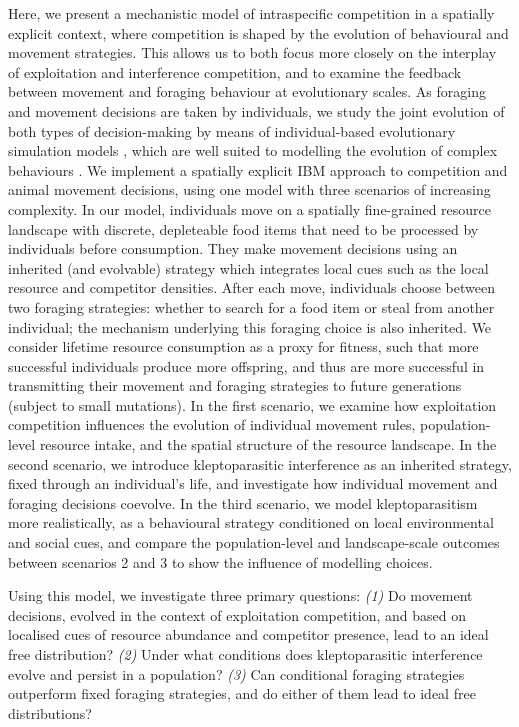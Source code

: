 \documentclass[11pt]{article}
\begin{document}
Here, we present a mechanistic model of intraspecific competition in a spatially explicit context, where competition is shaped by the evolution of behavioural and movement strategies.
This allows us to both focus more closely on the interplay of exploitation and interference competition, and to examine the feedback between movement and foraging behaviour at evolutionary scales. 
As foraging and movement decisions are taken by individuals, we study the joint evolution of both types of decision-making by means of individual-based evolutionary simulation models \citep[IBMs;][]{huston1988,deangelis2019}, which are well suited to modelling the evolution of complex behaviours \citep{netz2020,guttal2010,getz2016,getz2015}.
We implement a spatially explicit IBM approach to competition and animal movement decisions, using one model with three scenarios of increasing complexity.
In our model, individuals move on a spatially fine-grained resource landscape with discrete, depleteable food items that need to be processed by individuals before consumption.
They make movement decisions using an inherited (and evolvable) strategy which integrates local cues such as the local resource and competitor densities.
After each move, individuals choose between two foraging strategies: whether to search for a food item or steal from another individual; the mechanism underlying this foraging choice is also inherited.
We consider lifetime resource consumption as a proxy for fitness, such that more successful individuals produce more offspring, and thus are more successful in transmitting their movement and foraging strategies to future generations (subject to small mutations).
In the first scenario, we examine how exploitation competition influences the evolution of individual movement rules, population-level resource intake, and the spatial structure of the resource landscape.
In the second scenario, we introduce kleptoparasitic interference as an inherited strategy, fixed through an individual's life, and investigate how individual movement and foraging decisions coevolve.
In the third scenario, we model kleptoparasitism more realistically, as a behavioural strategy conditioned on local environmental and social cues, and compare the population-level and landscape-scale outcomes between scenarios 2 and 3 to show the influence of modelling choices.

Using this model, we investigate three primary questions:
\textit{(1)} Do movement decisions, evolved in the context of exploitation competition, and based on localised cues of resource abundance and competitor presence, lead to an ideal free distribution?
\textit{(2)} Under what conditions does kleptoparasitic interference evolve and persist in a population?
\textit{(3)} Can conditional foraging strategies outperform fixed foraging strategies, and do either of them lead to ideal free distributions?
\end{document}
